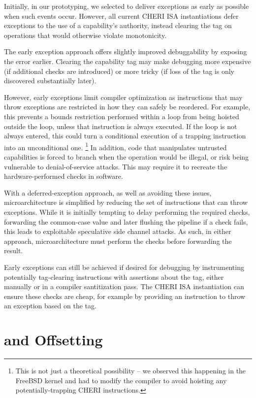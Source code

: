 Initially, in our prototyping, we selected to deliver exceptions as early as
possible when such events occur.
However, all current CHERI ISA instantiations defer exceptions to the use
of a capability's authority, instead clearing the tag on operations that
would otherwise violate monotonicity.

The early exception approach offers slightly improved debuggability
by exposing the error earlier.
Clearing the capability tag may make debugging more expensive (if additional checks are
introduced) or more tricky (if loss of the tag is only discovered substantially later).

However, early exceptions limit compiler optimization as instructions that may
throw exceptions are restricted in how they can safely be reordered.
For example, this prevents a bounds restriction performed within a loop from
being hoisted outside the loop, unless that instruction is always executed.
If the loop is not always entered, this could turn a conditional execution
of a trapping instruction into an unconditional one.%
\footnote{This is not just a theoretical possibility -- we observed this
 happening in the FreeBSD kernel and had to modify the compiler to avoid
 hoisting any potentially-trapping CHERI instructions.}
In addition, code that manipulates untrusted capabilities is forced to branch
when the operation would be illegal, or risk being vulnerable to
denial-of-service attacks.
This may require it to recreate the hardware-performed checks in software.

With a deferred-exception approach, as well as avoiding these issues,
microarchitecture is simplified by reducing the set of instructions that can
throw exceptions.
While it is initially tempting to delay performing the required checks,
forwarding the common-case value and later flushing the pipeline if a check
fails, this leads to exploitable speculative side channel attacks.
As such, in either approach, microarchitecture must perform the checks
before forwarding the result.

Early exceptions can still be achieved if desired for debugging by
instrumenting potentially tag-clearing instructions with assertions about
the tag, either manually or in a compiler santitization pass.
The CHERI ISA instantiation can ensure these checks are cheap, for example by
providing an instruction to throw an exception based on the tag.

\section{\DDC{} and \PCC{} Offsetting}

